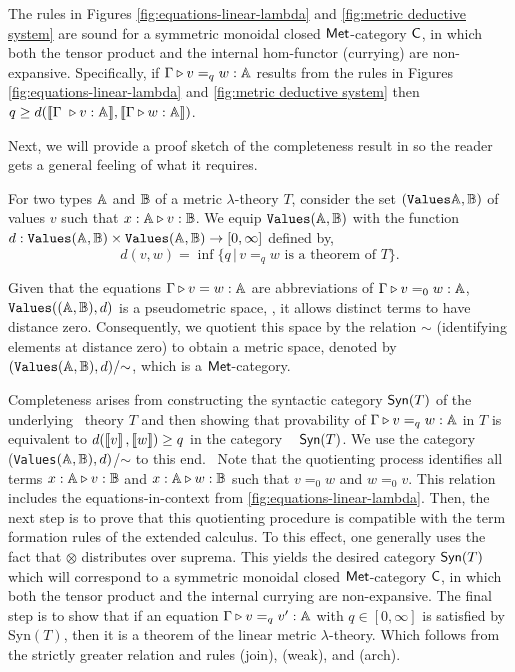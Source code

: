 \begin{theorem} [Soundness] \cite[Theorem 3.14]{dahlqvist2023syntactic}  \label{thm:soundness_metric_no_cond}
  The rules in Figures \ref{fig:equations-linear-lambda} and \ref{fig:metric deductive system} are sound for a  symmetric monoidal closed $\mathsf{Met}$-category  $\mathsf{C}$, in which both the tensor product and the internal hom-functor (currying) are non-expansive. Specifically, if $\Gamma \triangleright v =_{q} w : \mathbb{A} $ results from the rules in Figures \ref{fig:equations-linear-lambda} and \ref{fig:metric deductive system} then $q \geq d( \llbracket \Gamma  \vljud v : \typeA \rrbracket, \llbracket\Gamma \vljud w : \typeA \rrbracket)$.
\end{theorem}


Next, we will provide a proof sketch of the completeness result in \cite{dahlqvist2023syntactic} so the reader gets a general feeling of what it requires.

For two types $\mathbb{A}$ and $\mathbb{B}$ of a metric $\lambda$-theory $T$, consider the set $(\texttt{Values}\mathbb{A},\mathbb{B})$ of values $v$ such that $x : \mathbb{A} \triangleright v : \mathbb{B}$. We equip $\texttt{Values}(\mathbb{A},\mathbb{B})$ with the function $d :\texttt{Values}(\mathbb{A},\mathbb{B}) \times \texttt{Values}(\mathbb{A},\mathbb{B}) \rightarrow [0, \infty]$ defined by,
$$d(v,w)=\inf{\{q \, \vert \, v=_q w \text{ is a theorem of } T \}}.$$


Given that the equations $\Gamma \triangleright v = w : \mathbb{A}$ are abbreviations of $\Gamma \triangleright v =_0 w : \mathbb{A}$, $\texttt{Values}((\mathbb{A},\mathbb{B}), d)$ is a pseudometric space, \ie, it allows distinct terms to have distance zero. Consequently, we quotient this space by the relation $\sim$ (identifying elements at distance zero) to obtain a metric space, denoted by $(\texttt{Values}(\mathbb{A}, \mathbb{B}), d)/{\sim}$, which is a $\mathsf{Met}$-category.

Completeness arises from constructing the syntactic category $\mathsf{Syn}(T)$ of the underlying  theory
$T$ and then showing that provability of $\Gamma \triangleright v =_q w : \mathbb{A}$
 in $T$ is equivalent to $d(\left \llbracket v \right \rrbracket,\left \llbracket w \right \rrbracket) \geq q$ in the category
  $\mathsf{Syn}(T)$. We use the category (\texttt{Values}$(\mathbb{A},\mathbb{B}),d)$/$\sim$ to this end.  Note that the quotienting process identifies all terms $x : \mathbb{A} \triangleright v : \mathbb{B}$ and $x : \mathbb{A} \triangleright w : \mathbb{B}$ such that $v =_0 w$ and $w =_0 v$. This relation includes the equations-in-context from \autoref{fig:equations-linear-lambda}. Then, the next step is to prove that this quotienting procedure is compatible with the term formation rules of the extended calculus. To this effect, one generally uses the fact that $\otimes$ distributes over suprema. This yields the desired category $\mathsf{Syn}(T)$ which will correspond to a symmetric monoidal closed $\mathsf{Met}$-category $\mathsf{C}$, in which both the tensor product and the internal currying are non-expansive. The final step is to show that if an equation $\Gamma \triangleright v =_q v' : \mathbb{A}$ with $q \in [0, \infty]$ is satisfied by Syn$(T)$, then it is a theorem of the linear metric $\lambda$-theory. Which follows from the strictly greater relation and rules (join), (weak), and (arch).




